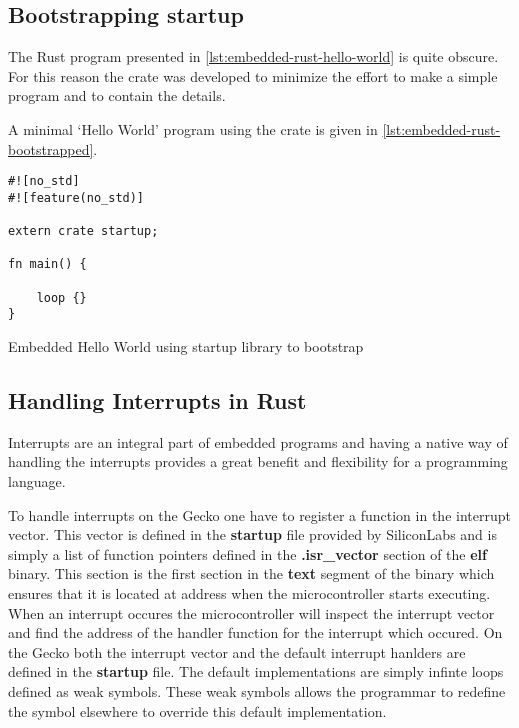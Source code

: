 \subsection{Bootstrapping startup}
\label{sec:startup}

The Rust program presented in \autoref{lst:embedded-rust-hello-world} is quite obscure.
For this reason the  crate was developed to minimize the effort to make a simple program and to contain the details.

A minimal `Hello World' program using the  crate is given in \autoref{lst:embedded-rust-bootstrapped}.

\begin{listing}[H]
  \begin{verbatim}
#![no_std]
#![feature(no_std)]

extern crate startup;

fn main() {

    loop {}
}
  \end{verbatim}
  \caption{Embedded Hello World using startup library to bootstrap}
  \label{lst:embedded-rust-bootstrapped}
\end{listing}

\subsection{Handling Interrupts in Rust}
\label{sec:impl:handling-interrupts}

Interrupts are an integral part of embedded programs and having a native way of handling the interrupts provides a great benefit and flexibility for a programming language.

To handle interrupts on the Gecko one have to register a function in the interrupt vector.
This vector is defined in the \textbf{startup} file provided by SiliconLabs and is simply a list of function pointers defined in the \textbf{.isr\_vector} section of the \textbf{elf} binary.
This section is the first section in the \textbf{text} segment of the binary which ensures that it is located at address  when the microcontroller starts executing.
When an interrupt occures the microcontroller will inspect the interrupt vector and find the address of the handler function for the interrupt which occured.
On the Gecko both the interrupt vector and the default interrupt hanlders are defined in the \textbf{startup} file.
The default implementations are simply infinte loops defined as weak symbols.
These weak symbols allows the programmar to redefine the symbol elsewhere to override this default implementation.

